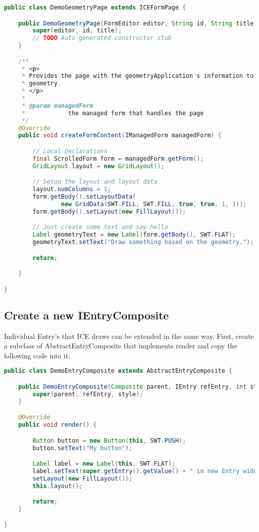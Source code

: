 \begin{lstlisting}[language=java]
public class DemoGeometryPage extends ICEFormPage {

    public DemoGeometryPage(FormEditor editor, String id, String title) {
        super(editor, id, title);
        // TODO Auto-generated constructor stub
    }

    /**
     * <p>
     * Provides the page with the geometryApplication's information to display
     * geometry.
     * </p>
     *
     * @param managedForm
     *            the managed form that handles the page
     */
    @Override
    public void createFormContent(IManagedForm managedForm) {

        // Local Declarations
        final ScrolledForm form = managedForm.getForm();
        GridLayout layout = new GridLayout();

        // Setup the layout and layout data
        layout.numColumns = 1;
        form.getBody().setLayoutData(
                new GridData(SWT.FILL, SWT.FILL, true, true, 1, 1));
        form.getBody().setLayout(new FillLayout());

        // Just create some text and say hello
        Label geometryText = new Label(form.getBody(), SWT.FLAT);
        geometryText.setText("Draw something based on the geometry.");

        return;

    }

}
\end{lstlisting}

\subsection{Create a new IEntryComposite}

Individual Entry’s that ICE draws can be extended in the same way. First,
create a subclass of AbstractEntryComposite that implements render and copy the
following code into it:

\begin{lstlisting}[language=java]
public class DemoEntryComposite extends AbstractEntryComposite {

    public DemoEntryComposite(Composite parent, IEntry refEntry, int style) {
        super(parent, refEntry, style);
    }

    @Override
    public void render() {

        Button button = new Button(this, SWT.PUSH);
        button.setText("My button");

        Label label = new Label(this, SWT.FLAT);
        label.setText(super.getEntry().getValue() + " in new Entry widget.");
        setLayout(new FillLayout());
        this.layout();

        return;
    }

}
\end{lstlisting}

